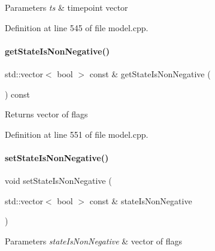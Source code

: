 \begin{DoxyParams}{Parameters}
{\em ts} & timepoint vector \\
\hline
\end{DoxyParams}


Definition at line 545 of file model.\+cpp.

\mbox{\label{classamici_1_1_model_a25b1fc032e0065d80d8bd1041ab84bbf}} 
\paragraph{\texorpdfstring{get\+State\+Is\+Non\+Negative()}{getStateIsNonNegative()}}
{\footnotesize\ttfamily std\+::vector$<$ bool $>$ const  \& get\+State\+Is\+Non\+Negative (\begin{DoxyParamCaption}{ }\end{DoxyParamCaption}) const}

\begin{DoxyReturn}{Returns}
vector of flags 
\end{DoxyReturn}


Definition at line 551 of file model.\+cpp.

\mbox{\label{classamici_1_1_model_a0a50693322a9383d8e98390d9894e841}} 
\paragraph{\texorpdfstring{set\+State\+Is\+Non\+Negative()}{setStateIsNonNegative()}}
{\footnotesize\ttfamily void set\+State\+Is\+Non\+Negative (\begin{DoxyParamCaption}\item[{std\+::vector$<$ bool $>$ const \&}]{state\+Is\+Non\+Negative }\end{DoxyParamCaption})}


\begin{DoxyParams}{Parameters}
{\em state\+Is\+Non\+Negative} & vector of flags \\
\hline
\end{DoxyParams}


